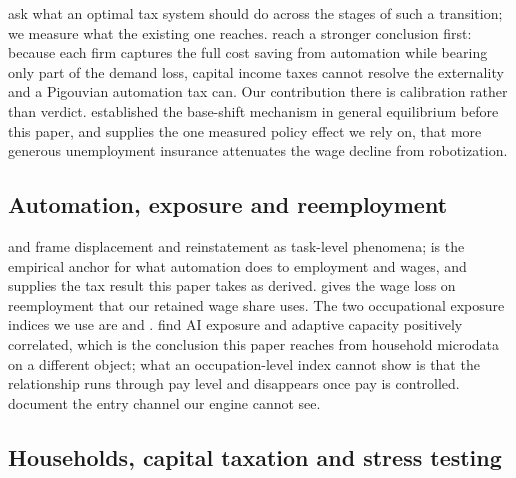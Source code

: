 \citet{KorinekLockwood2026} ask what an optimal tax system should do across the stages of such a
transition; we measure what the existing one reaches. \citet{FalkTsoukalas2026} reach a stronger
conclusion first: because each firm captures the full cost saving from automation while bearing
only part of the demand loss, capital income taxes cannot resolve the externality and a Pigouvian
automation tax can. Our contribution there is calibration rather than verdict.
\citet{CasasTorres2024} established the base-shift mechanism in general equilibrium before this
paper, and \citet{Brollo2024} supplies the one measured policy effect we rely on, that
more generous unemployment insurance attenuates the wage decline from robotization.

\subsection{Automation, exposure and reemployment}

\citet{Autor2015} and \citet{AcemogluRestrepo2019} frame displacement and reinstatement as
task-level phenomena; \citet{AcemogluRestrepo2020} is the empirical anchor for what automation
does to employment and wages, and \citet{AcemogluManeraRestrepo2020} supplies the tax result this
paper takes as derived. \citet{Huckfeldt2022} gives the wage loss on reemployment that our
retained wage share uses. The two occupational exposure indices we use are
\citet{FeltenRajSeamans2021} and \citet{EloundouManningMishkinRock2024}.
\citet{ManningAguirreMuroMethkupally2026} find AI exposure and adaptive capacity positively
correlated, which is the conclusion this paper reaches from household microdata on a different
object; what an occupation-level index cannot show is that the relationship runs through pay level
and disappears once pay is controlled. \citet{BrynjolfssonChandarChen2026} document the entry
channel our engine cannot see.

\subsection{Households, capital taxation and stress testing}

